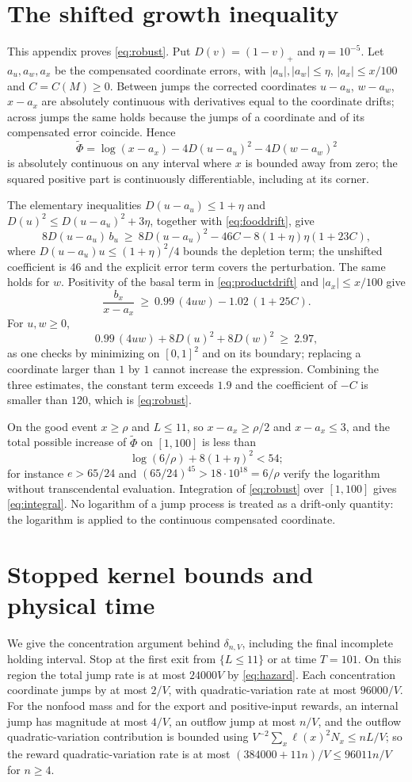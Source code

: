 \documentclass[11pt,letterpaper]{article}
\theoremstyle{plain}
\theoremstyle{definition}
\theoremstyle{remark}
\numberwithin{equation}{section}
\newcommand{\Dp}{D}
\begin{document}
\appendix

\section{The shifted growth inequality}\label{app:shift}
This appendix proves \eqref{eq:robust}. Put $\Dp(v)=(1-v)_+$ and $\eta=10^{-5}$. Let $a_u,a_w,a_x$ be the compensated coordinate errors, with $|a_u|,|a_w|\le\eta$, $|a_x|\le x/100$ and $C=C(M)\ge0$. Between jumps the corrected coordinates $u-a_u$, $w-a_w$, $x-a_x$ are absolutely continuous with derivatives equal to the coordinate drifts; across jumps the same holds because the jumps of a coordinate and of its compensated error coincide. Hence
\[
 \widetilde\Phi=\log(x-a_x)-4\Dp(u-a_u)^2-4\Dp(w-a_w)^2
\]
is absolutely continuous on any interval where $x$ is bounded away from zero; the squared positive part is continuously differentiable, including at its corner.

The elementary inequalities $\Dp(u-a_u)\le1+\eta$ and $\Dp(u)^2\le\Dp(u-a_u)^2+3\eta$, together with \eqref{eq:fooddrift}, give
\[
 8\Dp(u-a_u)\,b_u\ \ge\ 8\Dp(u-a_u)^2-46C-8(1+\eta)\eta(1+23C),
\]
where $\Dp(u-a_u)u\le(1+\eta)^2/4$ bounds the depletion term; the unshifted coefficient is $46$ and the explicit error term covers the perturbation. The same holds for $w$. Positivity of the basal term in \eqref{eq:productdrift} and $|a_x|\le x/100$ give
\[
 \frac{b_x}{x-a_x}\ \ge\ 0.99\,(4uw)-1.02\,(1+25C).
\]
For $u,w\ge0$,
\[
 0.99\,(4uw)+8\Dp(u)^2+8\Dp(w)^2\ \ge\ 2.97 ,
\]
as one checks by minimizing on $[0,1]^2$ and on its boundary; replacing a coordinate larger than $1$ by $1$ cannot increase the expression. Combining the three estimates, the constant term exceeds $1.9$ and the coefficient of $-C$ is smaller than $120$, which is \eqref{eq:robust}.

On the good event $x\ge\rho$ and $L\le11$, so $x-a_x\ge\rho/2$ and $x-a_x\le3$, and the total possible increase of $\widetilde\Phi$ on $[1,100]$ is less than
\[
 \log(6/\rho)+8(1+\eta)^2<54 ;
\]
for instance $e>65/24$ and $(65/24)^{45}>18\cdot10^{18}=6/\rho$ verify the logarithm without transcendental evaluation. Integration of \eqref{eq:robust} over $[1,100]$ gives \eqref{eq:integral}. No logarithm of a jump process is treated as a drift-only quantity: the logarithm is applied to the continuous compensated coordinate.

\section{Stopped kernel bounds and physical time}\label{app:noise}
We give the concentration argument behind $\delta_{n,V}$, including the final incomplete holding interval. Stop at the first exit from $\{L\le11\}$ or at time $T=101$. On this region the total jump rate is at most $24000V$ by \eqref{eq:hazard}. Each concentration coordinate jumps by at most $2/V$, with quadratic-variation rate at most $96000/V$. For the nonfood mass and for the export and positive-input rewards, an internal jump has magnitude at most $4/V$, an outflow jump at most $n/V$, and the outflow quadratic-variation contribution is bounded using $V^{-2}\sum_x\ell(x)^2N_x\le nL/V$; so the reward quadratic-variation rate is at most $(384000+11n)/V\le96011n/V$ for $n\ge4$.
\end{document}
